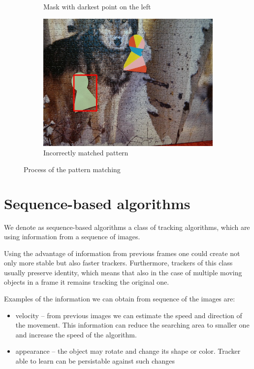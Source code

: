 \begin{figure}
\begin{subfigure}{0.48\linewidth}
    \caption{Mask with darkest point on the left}
  \end{subfigure}
  \begin{subfigure}{0.48\linewidth}
    \includegraphics[width=\linewidth]{img/pattern_matching/result-incorrect.jpg}
    \caption{Incorrectly matched pattern}
  \end{subfigure}
  \caption{Process of the pattern matching}
  \label{fig:pattern-matching-tracker}
\end{figure}


\section{Sequence-based algorithms}

We denote as sequence-based algorithms a class of tracking algorithms, which
are using information from a sequence of images.

Using the advantage of information from previous frames one could create not
only more stable but also faster trackers. Furthermore, trackers of this class
usually preserve identity, which means that also in the case of multiple moving
objects in a frame it remains tracking the original one.

Examples of the information we can obtain from sequence of the images are:
\begin{itemize}
\item velocity -- from previous images we can estimate the speed and direction of
  the movement. This information can reduce the searching area to smaller one
  and increase the speed of the algorithm.
\item appearance -- the object may rotate and change its shape or color. Tracker able to
  learn can be persistable against such changes
\end{itemize}

